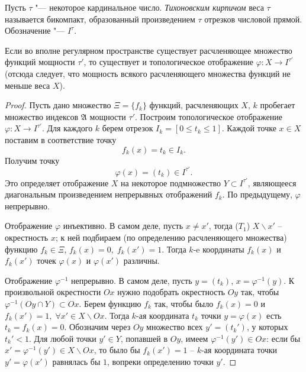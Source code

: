 \begin{definition}
    Пусть $\tau$ "--- некоторое кардинальное число. \textit{Тихоновским кирпичом} веса $\tau$ называется бикомпакт, образованный произведением $\tau$ отрезков числовой прямой. Обозначение "--- $I^{\tau}$.
\end{definition}

\begin{proposition}\label{thm2prop2}
    Если во вполне регулярном пространстве существует расчленяющее множество функций мощности $\tau'$, то существует и топологическое отображение $\varphi:X\rightarrow
I^{\tau'}$ (отсюда следует, что мощность всякого расчленяющего множества функций не меньше веса $X$).
\end{proposition}

\begin{proof}
    Пусть дано множество $\Xi = \lbrace f_k\rbrace$ функций, расчленяющих $X$, $k$ пробегает множество индексов $\mathfrak{A}$ мощности $\tau'$.
Построим топологическое отображение $\varphi:X\rightarrow I^{\tau'}$. Для каждого $k$ берем отрезок $I_k = [0\leq t_k\leq 1]$. Каждой точке $x\in X$ поставим в соответствие
точку
$$
f_k(x) = t_k\in I_k.
$$
Получим точку
$$
\varphi(x) = (t_k)\in I^{\tau'}.
$$
Это определяет отображение $X$ на некоторое подмножество $Y\subset I^{\tau'}$, являющееся диагональным произведением непрерывных отображений $f_k$. По предыдущему,
$\varphi$ непрерывно.

Отображение $\varphi$ инъективно. В самом деле, пусть $x\neq x'$, тогда ($T_1$) $X\backslash x'$ -- окрестность $x$; к ней подбираем (по определению расчленяющего множества) функцию
$f_k\in\Xi$, $f_k(x) = 0,\;f_k(x') = 1$. Тогда $k$-e координаты $f_k(x)$ и $f_k(x')$ точек $\varphi(x)$ и $\varphi(x')$ различны.

Отображение $\varphi^{-1}$ непрерывно. В самом деле, пусть $y = (t_k)$, $x = \varphi^{-1}(y)$. К произвольной окрестности $Ox$ нужно подобрать окрестность $Oy$ так, чтобы
$\varphi^{-1}(Oy\cap Y)\subset Ox$. Берем функцию $f_k$ так, чтобы было $f_k(x) = 0$ и $f_k(x') = 1,\;\forall x'\in X\backslash Ox$. Тогда $k$-ая координата $t_k$ точки
$y=\varphi(x)$ есть $t_k = f_k(x)= 0$. Обозначим через $Oy$ множество всех $y' = (t_k')$, у которых $t_k'<1$. Для любой точки $y'\in Y$, попавшей в $Oy$, имеем
$\varphi^{-1}(y')\in Ox$: если бы $x' = \varphi^{-1}(y')\in X\backslash Ox$, то было бы $f_k(x') = 1$ -- $k$-ая координата точки $y' = \varphi(x')$ равнялась бы $1$, вопреки
определению точки $y'$.
\end{proof}

